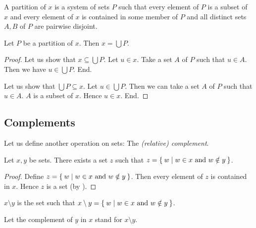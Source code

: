 \documentclass[../../set-theory.tex]{subfiles}
\begin{document}
  \begin{forthel}
    \begin{definition}
      A partition of $x$ is a system of sets $P$ such that every element of $P$ is a subset of $x$ and every element of $x$ is contained in some member of $P$ and all distinct sets $A,B$ of $P$ are pairwise disjoint.
    \end{definition}

    \begin{proposition}\label{SetTheory_01_01_493610}
      Let $P$ be a partition of $x$.
      Then $x = \bigcup P$.
    \end{proposition}
    \begin{proof}
      Let us show that $x \subseteq \bigcup P$.
        Let $u \in x$.
        Take a set $A$ of $P$ such that $u \in A$.
        Then we have $u \in \bigcup P$.
      End.

      Let us show that $\bigcup P \subseteq x$.
        Let $u \in \bigcup P$.
        Then we can take a set $A$ of $P$ such that $u \in A$.
        $A$ is a subset of $x$.
        Hence $u \in x$.
      End.
    \end{proof}
  \end{forthel}


  \subsection{Complements}

  \noindent Let us define another operation on sets: The \textit{(relative)
  complement}.

  \begin{forthel}
    \begin{lemma}
      Let $x,y$ be sets.
      There exists a set $z$ such that $z = \Set{w | \text{$w \in x$ and $w \notin y$}}$.
    \end{lemma}
    \begin{proof}
      Define $z = \Set{w | \text{$w \in x$ and $w \notin y$}}$.
      Then every element of $z$ is contained in $x$.
      Hence $z$ is a set (by ).
    \end{proof}

    \begin{definition}
      $x \setminus y$ is the set such that $x \setminus y = \Set{w | \text{$w \in x$ and $w \notin y$}}$.
    \end{definition}

    Let the complement of $y$ in $x$ stand for $x \setminus y$.
  \end{forthel}
\end{document}

